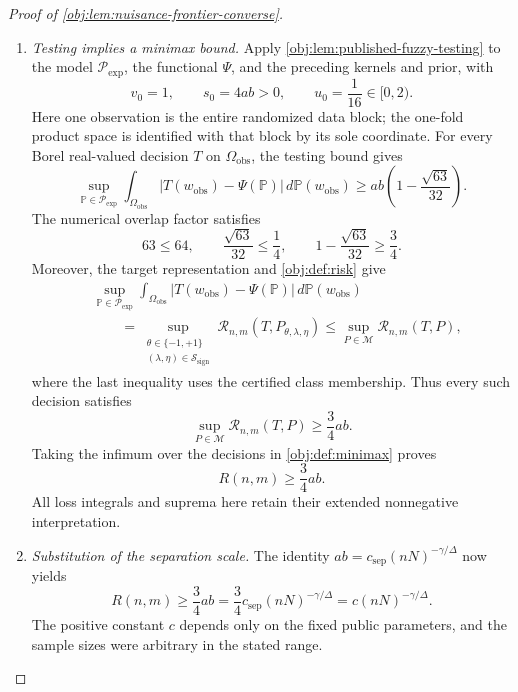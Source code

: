 \begin{proof}[Proof of \cref{obj:lem:nuisance-frontier-converse}]
\begin{enumerate}
\item \textit{Testing implies a minimax bound.}
Apply \cref{obj:lem:published-fuzzy-testing} to the model \(\mathcal P_{\mathrm{exp}}\), the functional \(\Psi\), and the preceding kernels and prior, with
\[
v_0=1,\qquad s_0=4ab>0,\qquad
u_0=\frac1{16}\in[0,2).
\]
Here one observation is the entire randomized data block; the one-fold product space is identified with that block by its sole coordinate. For every Borel real-valued decision \(T\) on \(\Omega_{\mathrm{obs}}\), the testing bound gives
\[
\sup_{\mathbb P\in\mathcal P_{\mathrm{exp}}}
\int_{\Omega_{\mathrm{obs}}}
\left|T(w_{\mathrm{obs}})-\Psi(\mathbb P)\right|
\,d\mathbb P(w_{\mathrm{obs}})
\ge
ab\left(1-\frac{\sqrt{63}}{32}\right).
\]
The numerical overlap factor satisfies
\[
63\le64,\qquad
\frac{\sqrt{63}}{32}\le\frac14,\qquad
1-\frac{\sqrt{63}}{32}\ge\frac34.
\]
Moreover, the target representation and \cref{obj:def:risk} give
\[
\begin{aligned}
&\sup_{\mathbb P\in\mathcal P_{\mathrm{exp}}}
\int_{\Omega_{\mathrm{obs}}}
\left|T(w_{\mathrm{obs}})-\Psi(\mathbb P)\right|
\,d\mathbb P(w_{\mathrm{obs}})\\
&\qquad=
\sup_{\substack{\theta\in\{-1,+1\}\\
(\lambda,\eta)\in\mathcal S_{\mathrm{sign}}}}
\mathcal R_{n,m}(T,P_{\theta,\lambda,\eta})
\le
\sup_{P\in\mathcal M}\mathcal R_{n,m}(T,P),
\end{aligned}
\]
where the last inequality uses the certified class membership. Thus every such decision satisfies
\[
\sup_{P\in\mathcal M}\mathcal R_{n,m}(T,P)\ge\frac34ab.
\]
Taking the infimum over the decisions in \cref{obj:def:minimax} proves
\[
R(n,m)\ge\frac34ab.
\]
All loss integrals and suprema here retain their extended nonnegative interpretation.

\item \textit{Substitution of the separation scale.}
The identity \(ab=c_{\mathrm{sep}}(nN)^{-\gamma/\Delta}\) now yields
\[
R(n,m)
\ge\frac34ab
=\frac34c_{\mathrm{sep}}(nN)^{-\gamma/\Delta}
=c(nN)^{-\gamma/\Delta}.
\]
The positive constant \(c\) depends only on the fixed public parameters, and the sample sizes were arbitrary in the stated range.
\end{enumerate}
\end{proof}
